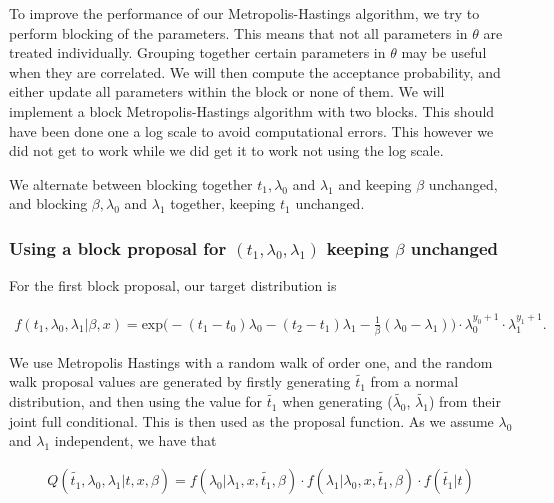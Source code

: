 To improve the performance of our Metropolis-Hastings algorithm, we try to perform blocking of the parameters. This means that not all parameters in $\theta$ are treated individually. Grouping together certain parameters in $\theta$ may be useful when they are correlated. We will then compute the acceptance probability, and either update all parameters within the block or none of them. We will implement a block Metropolis-Hastings algorithm with two blocks. This should have been done one a log scale to avoid computational errors. This however we did not get to work while we did get it to work not using the log scale. 


We alternate between blocking together $t_1, \lambda_0$ and  $ \lambda_1$ and keeping $\beta$ unchanged, and blocking $\beta, \lambda_0$ and $\lambda_1$ together, keeping $t_1$ unchanged.


\subsubsection{Using a block proposal for $(t_1, \lambda_0, \lambda_1)$ keeping $\beta$ unchanged}

For the first block proposal, our target distribution is

\begin{align}
    f(t_1, \lambda_0, \lambda_1|\beta, x) = \text{exp} \Big( -(t_1-t_0)\lambda_0 -(t_2-t_1)\lambda_1 - \frac{1}{\beta}(\lambda_0 - \lambda_1)\Big) \cdot\lambda_0^{y_0 + 1} \cdot \lambda_1^{y_1 + 1}.
\end{align}

We use Metropolis Hastings with a random walk of order one, and the random walk proposal values are generated by firstly generating $\widetilde{t_1}$ from a normal distribution, and then using the value for $\widetilde{t_1}$ when generating ($\widetilde{\lambda_0}$, $\widetilde{\lambda_1}$) from their joint full conditional. This is then used as the proposal function. As we assume $\lambda_0$ and $\lambda_1$ independent, we have that 

\begin{align}
    Q(\widetilde{t_1}, \lambda_0, \lambda_1 |t, x, \beta) = f(\lambda_0| \lambda_1, x, \widetilde{t_1}, \beta)\cdot f(\lambda_1| \lambda_0, x, \widetilde{t_1}, \beta)\cdot f(\widetilde{t_1}| t) 
\end{align}

